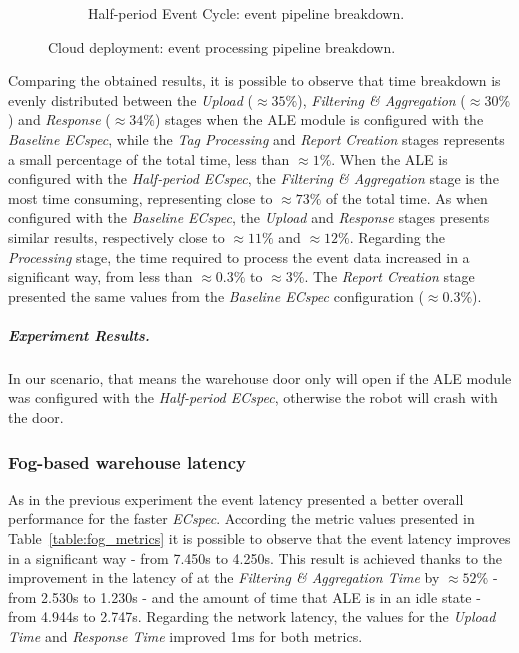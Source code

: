 \begin{figure}[ht!]
\begin{subfigure}{.5\textwidth}
        \caption{Half-period Event Cycle: event pipeline breakdown.}
        \label{fig:ecspecf_effective_half}
      \end{subfigure}
      \caption[Cloud deployment: event processing breakdown.]{Cloud deployment: event processing pipeline breakdown.}
      \label{fig:ecspecf_effective_breakdown}
    \end{figure}

    Comparing the obtained results, it is possible to observe that time breakdown is evenly distributed
    between the \textit{Upload} ($\approx35\%$), \textit{Filtering \& Aggregation} ($\approx30\%$) and
    \textit{Response} ($\approx34\%$) stages when the \gls{ALE} module is configured with the \textit{Baseline ECspec},
    while the \textit{Tag Processing} and \textit{Report Creation} stages represents a small percentage of the
    total time, less than $\approx1\%$. When the \gls{ALE} is configured with the \textit{Half-period ECspec},
    the \textit{Filtering \& Aggregation} stage is the most time consuming, representing close to $\approx 73\%$
    of the total time. As when configured with the \textit{Baseline ECspec}, the \textit{Upload} and
    \textit{Response} stages presents similar results, respectively close to $\approx11\%$ and $\approx12\%$.
    Regarding the \textit{Processing} stage, the time required to process the event data increased in a significant
    way, from less than $\approx0.3\%$ to $\approx3\%$. The \textit{Report Creation} stage presented the same
    values from the \textit{Baseline ECspec} configuration ($\approx0.3\%$).

    \subparagraph{Experiment Results.}
    \label{subp:cloud_experiment_result}
    In our scenario, that means the warehouse door only will open if the \gls{ALE} module was configured
    with the \textit{Half-period ECspec}, otherwise the robot will crash with the door.

    \subsubsection{Fog-based warehouse latency}
    \label{subs:eval_exp_latency_ecspec}
    As in the previous experiment the event latency presented a better overall performance for the
    faster \textit{ECspec}. According the metric values presented in Table~\ref{table:fog_metrics} it is
    possible to observe that the event latency improves in a significant way - from 7.450s to 4.250s. This
    result is achieved thanks to the improvement in the latency of at the \textit{Filtering \& Aggregation Time}
    by $\approx52\%$ - from 2.530s to 1.230s - and the amount of time that \gls{ALE} is in an idle state -
    from 4.944s to 2.747s. Regarding the network latency, the values for the \textit{Upload Time}
    and \textit{Response Time} improved 1ms for both metrics.\\

